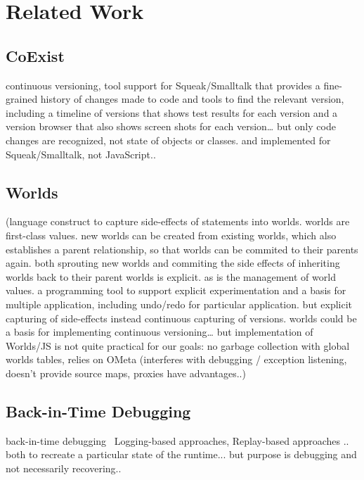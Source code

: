 \section{Related Work} \label{sec:RELATED_WORK}

\subsection{CoExist}

\cite{Steinert2012COE}
continuous versioning, tool support for Squeak/Smalltalk that provides a fine-grained history of changes made to code and tools to find the relevant version, including a timeline of versions that shows test results for each version and a version browser that also shows screen shots for each version… but only code changes are recognized, not state of objects or classes. and implemented for Squeak/Smalltalk, not JavaScript..


\subsection{Worlds}

(language construct to capture side-effects of statements into worlds. worlds are first-class values. new worlds can be created from existing worlds, which also establishes a parent relationship, so that worlds can be commited to their parents again. both sprouting new worlds and commiting the side effects of inheriting worlds back to their parent worlds is explicit. as is the management of world values. a programming tool to support explicit experimentation and a basis for multiple application, including undo/redo for particular application. but explicit capturing of side-effects instead continuous capturing of versions. 
worlds could be a basis for implementing continuous versioning… but implementation of Worlds/JS is not quite practical for our goals: no garbage collection with global worlds tables, relies on OMeta (interferes with debugging / exception listening, doesn’t provide source maps, proxies have advantages..)


\subsection{Back-in-Time Debugging}

back-in-time debugging~\cite{Lewis2003BIT}
Logging-based approaches, Replay-based approaches .. both to recreate a particular state of the runtime... but purpose is debugging and not necessarily recovering.. 

